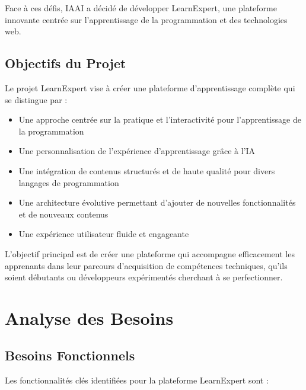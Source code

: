 Face à ces défis, IAAI a décidé de développer LearnExpert, une plateforme innovante centrée sur l'apprentissage de la programmation et des technologies web.

\subsection{Objectifs du Projet}
Le projet LearnExpert vise à créer une plateforme d'apprentissage complète qui se distingue par :

\begin{itemize}
  \item Une approche centrée sur la pratique et l'interactivité pour l'apprentissage de la programmation
  \item Une personnalisation de l'expérience d'apprentissage grâce à l'IA
  \item Une intégration de contenus structurés et de haute qualité pour divers langages de programmation
  \item Une architecture évolutive permettant d'ajouter de nouvelles fonctionnalités et de nouveaux contenus
  \item Une expérience utilisateur fluide et engageante
\end{itemize}

L'objectif principal est de créer une plateforme qui accompagne efficacement les apprenants dans leur parcours d'acquisition de compétences techniques, qu'ils soient débutants ou développeurs expérimentés cherchant à se perfectionner.

\section{Analyse des Besoins}

\subsection{Besoins Fonctionnels}
Les fonctionnalités clés identifiées pour la plateforme LearnExpert sont :

